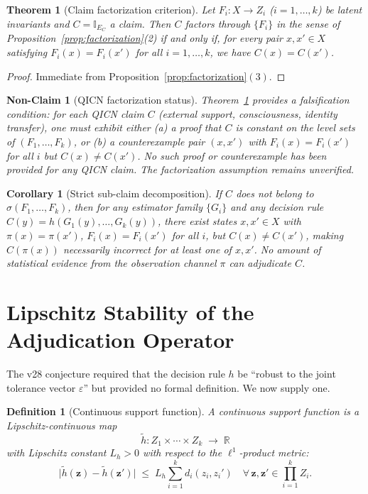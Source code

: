 \documentclass[11pt]{article}
\newtheorem{definition}{Definition}
\newtheorem{theorem}{Theorem}
\newtheorem{corollary}{Corollary}
\newtheorem{nonclaim}{Non-Claim}
\begin{document}
\begin{theorem}[Claim factorization criterion]\label{thm:factorization}
Let $F_i\colon X\to Z_i$ ($i=1,\ldots,k$) be latent invariants and $C=\mathbb{I}_{E_C}$ a claim. Then $C$ factors through $\{F_i\}$ in the sense of Proposition~\ref{prop:factorization}(2) if and only if, for every pair $x,x'\in X$ satisfying $F_i(x)=F_i(x')$ for all $i=1,\ldots,k$, we have $C(x)=C(x')$.
\end{theorem}

\begin{proof}
Immediate from Proposition~\ref{prop:factorization}$(3)$.
\end{proof}

\begin{nonclaim}[QICN factorization status]
Theorem~\ref{thm:factorization} provides a \emph{falsification condition}: for each QICN claim $C$ (external support, consciousness, identity transfer), one must exhibit either (a) a proof that $C$ is constant on the level sets of $(F_1,\ldots,F_k)$, or (b) a counterexample pair $(x,x')$ with $F_i(x)=F_i(x')$ for all $i$ but $C(x)\neq C(x')$. No such proof or counterexample has been provided for any QICN claim. The factorization assumption remains \emph{unverified}.
\end{nonclaim}

\begin{corollary}[Strict sub-claim decomposition]
If $C$ does not belong to $\sigma(F_1,\ldots,F_k)$, then for any estimator family $\{G_i\}$ and any decision rule $\hat{C}(y)=h(G_1(y),\ldots,G_k(y))$, there exist states $x,x'\in X$ with $\pi(x)=\pi(x')$, $F_i(x)=F_i(x')$ for all $i$, but $C(x)\neq C(x')$, making $\hat{C}(\pi(x))$ necessarily incorrect for at least one of $x,x'$. No amount of statistical evidence from the observation channel $\pi$ can adjudicate $C$.
\end{corollary}

\section{Lipschitz Stability of the Adjudication Operator}
\label{sec:lipschitz}

The v28 conjecture required that the decision rule $h$ be ``robust to the joint tolerance vector $\varepsilon$'' but provided no formal definition. We now supply one.

\begin{definition}[Continuous support function]
A \emph{continuous support function} is a Lipschitz-continuous map
\[
\tilde{h}\colon Z_1\times\cdots\times Z_k\;\longrightarrow\;\mathbb{R}
\]
with Lipschitz constant $L_h>0$ with respect to the $\ell^1$-product metric:
\[
\bigl|\tilde{h}(\mathbf{z})-\tilde{h}(\mathbf{z}')\bigr|
\;\leq\;L_h\sum_{i=1}^k d_i(z_i,z_i')
\quad\forall\,\mathbf{z},\mathbf{z}'\in\prod_{i=1}^k Z_i.
\]
\end{definition}
\end{document}
